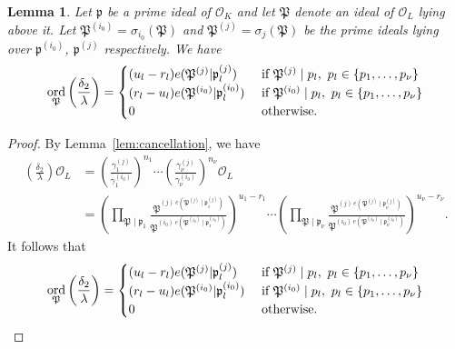 \documentclass[11pt]{report}
\newtheorem{lemma}[theorem]{Lemma}
\theoremstyle{definition}
\DeclareMathOperator{\ord}{ord}
\begin{document}
\begin{lemma}\label{lem:ordpz}
Let $\mathfrak{p}$ be a prime ideal of $\mathcal{O}_K$ and let $\mathfrak{P}$ denote an ideal of $\mathcal{O}_L$ lying above it. Let $\mathfrak{P}^{(i_0)} = \sigma_{i_0}(\mathfrak{P})$ and $\mathfrak{P}^{(j)} = \sigma_{j}(\mathfrak{P})$ be the prime ideals lying over $\mathfrak{p}^{(i_0)}$, $\mathfrak{p}^{(j)}$ respectively. We have
\[\ord_{\mathfrak{P}}\left(\frac{\delta_2}{\lambda}\right)=
\begin{cases}
(u_l - r_l)e(\mathfrak{P}^{(j)}|\mathfrak{p}_l^{(j)})
	& \textnormal{ if } \mathfrak{P}^{(j)} \mid p_l , \ p_l \in \{p_1,\dots, p_{\nu}\}\\
(r_l - u_l)e(\mathfrak{P}^{(i_0)}|\mathfrak{p}_l^{(i_0)})
	& \textnormal{ if } \mathfrak{P}^{(i_0)}\mid p_l, \ p_l \in \{p_1,\dots, p_{\nu}\}\\
0 	& \textnormal{ otherwise}.
\end{cases}\]
\end{lemma}
\begin{proof}

By Lemma~\ref{lem:cancellation}, we have
\begin{align*}
\left(\frac{\delta_2}{\lambda}\right)\mathcal{O}_L
	& = \left( \frac{\gamma_1^{(j)}}{\gamma_1^{(i_0)}}\right)^{n_1}\cdots \left( \frac{\gamma_{\nu}^{(j)}}{\gamma_{\nu}^{(i_0)}}\right)^{n_{\nu}} \mathcal{O}_L\\
	& = \left(\prod_{\mathfrak{P}\mid\mathfrak{p}_1} \frac{\mathfrak{P}^{(j) \ e(\mathfrak{P}^{(j)}\mid\mathfrak{p}_1^{(j)})}}{\mathfrak{P}^{(i_0) \ e(\mathfrak{P}^{(i_0)}\mid\mathfrak{p}^{(i_0)}_1)}}\right)^{u_1 - r_1} \cdots \left(\prod_{\mathfrak{P}\mid\mathfrak{p}_{\nu}} \frac{\mathfrak{P}^{(j) \ e(\mathfrak{P}^{(j)}\mid\mathfrak{p}^{(j)}_{\nu})}}{\mathfrak{P}^{(i_0) \ e(\mathfrak{P}^{(i_0)}\mid\mathfrak{p}^{(i_0)}_{\nu})}}\right)^{u_{\nu} - r_{\nu}}.
\end{align*}
It follows that
\[\ord_{\mathfrak{P}}\left( \frac{\delta_2}{\lambda}\right)=
\begin{cases}
(u_l - r_l)e(\mathfrak{P}^{(j)}|\mathfrak{p}_l^{(j)})
	& \textnormal{ if } \mathfrak{P}^{(j)} \mid p_l , \ p_l \in \{p_1,\dots, p_{\nu}\}\\
(r_l - u_l)e(\mathfrak{P}^{(i_0)}|\mathfrak{p}_l^{(i_0)})
	& \textnormal{ if } \mathfrak{P}^{(i_0)}\mid p_l, \ p_l \in \{p_1,\dots, p_{\nu}\}\\
0 	& \textnormal{ otherwise}.
\end{cases}\]
\end{proof}
\end{document}
